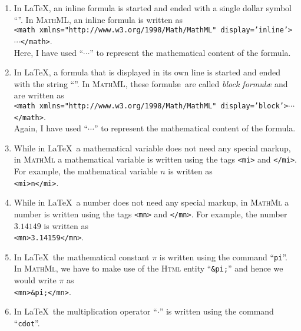 \begin{enumerate}
\item In \LaTeX, an inline formula is started and ended with a single dollar symbol
      ``\texttt{}''.  
      In \textsc{MathML}, an inline formula is written as
      \\[0.2cm]
      \hspace*{1.3cm}
      \texttt{<math xmlns="http://www.w3.org/1998/Math/MathML" display='inline'>$\cdots$</math>}.
      \\[0.2cm]
      Here, I have used ``$\cdots$'' to represent the mathematical content of the formula.
\item In \LaTeX, a formula that is displayed in its own line is started and ended with the string
      ``\texttt{}''.  
      In \textsc{MathML}, these formul\ae\ are called \emph{block formul\ae} and are written as
      \\[0.2cm]
      \hspace*{1.3cm}
      \texttt{<math xmlns="http://www.w3.org/1998/Math/MathML" display='block'>$\cdots$</math>}.
      \\[0.2cm]
      Again, I have used ``$\cdots$'' to represent the mathematical content of the formula.
\item While in \LaTeX\ a mathematical variable does not need any special markup, in \textsc{MathMl}
      a mathematical variable is written using the tags 
      \texttt{<mi>} and \texttt{</mi>}.  For example, the mathematical variable $n$ is written as    
      \\[0.2cm]
      \hspace*{1.3cm}
      \texttt{<mi>n</mi>}.
\item While in \LaTeX\ a number does not need any special markup, in \textsc{MathMl}
      a number is written using the tags 
      \texttt{<mn>} and \texttt{</mn>}.  For example, the number $3.14149$ is written as    
      \\[0.2cm]
      \hspace*{1.3cm}
      \texttt{<mn>3.14159</mn>}.
\item In \LaTeX\ the mathematical constant $\pi$ is written using the command ``\texttt{pi}''.
      In \textsc{MathMl}, we have to make use of the \textsc{Html} entity ``\texttt{\&pi;}'' and
      hence we would write $\pi$ as
      \\[0.2cm]
      \hspace*{1.3cm}
      \texttt{<mn>\&pi;</mn>}.
\item In \LaTeX\ the multiplication operator ``$\cdot$'' is written using the command ``\texttt{cdot}''.

\end{enumerate}
